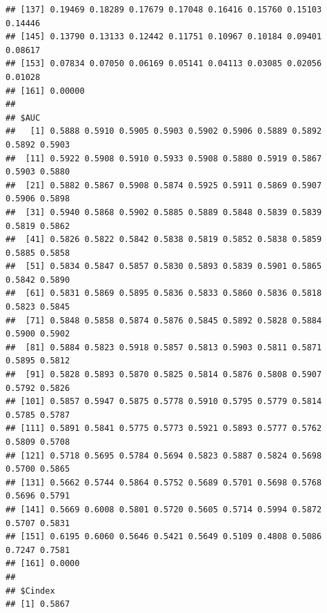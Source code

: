 \documentclass{article}\usepackage[]{graphicx}\usepackage[]{color}
\makeatletter
\newenvironment{kframe}{%
 \def\at@end@of@kframe{}%
 \ifinner\ifhmode%
  \def\at@end@of@kframe{\end{minipage}}%
  \begin{minipage}{\columnwidth}%
 \fi\fi%
 \def\FrameCommand##1{\hskip\@totalleftmargin \hskip-\fboxsep
 \colorbox{shadecolor}{##1}\hskip-\fboxsep
     \hskip-\linewidth \hskip-\@totalleftmargin \hskip\columnwidth}%
 \MakeFramed {\advance\hsize-\width
   \@totalleftmargin\z@ \linewidth\hsize
   \@setminipage}}%
 {\par\unskip\endMakeFramed%
 \at@end@of@kframe}
\newenvironment{knitrout}{}{} %
\makeatother
\begin{document}
\begin{knitrout}
\begin{kframe}
\begin{verbatim}
## [137] 0.19469 0.18289 0.17679 0.17048 0.16416 0.15760 0.15103 0.14446
## [145] 0.13790 0.13133 0.12442 0.11751 0.10967 0.10184 0.09401 0.08617
## [153] 0.07834 0.07050 0.06169 0.05141 0.04113 0.03085 0.02056 0.01028
## [161] 0.00000
## 
## $AUC
##   [1] 0.5888 0.5910 0.5905 0.5903 0.5902 0.5906 0.5889 0.5892 0.5892 0.5903
##  [11] 0.5922 0.5908 0.5910 0.5933 0.5908 0.5880 0.5919 0.5867 0.5903 0.5880
##  [21] 0.5882 0.5867 0.5908 0.5874 0.5925 0.5911 0.5869 0.5907 0.5906 0.5898
##  [31] 0.5940 0.5868 0.5902 0.5885 0.5889 0.5848 0.5839 0.5839 0.5819 0.5862
##  [41] 0.5826 0.5822 0.5842 0.5838 0.5819 0.5852 0.5838 0.5859 0.5885 0.5858
##  [51] 0.5834 0.5847 0.5857 0.5830 0.5893 0.5839 0.5901 0.5865 0.5842 0.5890
##  [61] 0.5831 0.5869 0.5895 0.5836 0.5833 0.5860 0.5836 0.5818 0.5823 0.5845
##  [71] 0.5848 0.5858 0.5874 0.5876 0.5845 0.5892 0.5828 0.5884 0.5900 0.5902
##  [81] 0.5884 0.5823 0.5918 0.5857 0.5813 0.5903 0.5811 0.5871 0.5895 0.5812
##  [91] 0.5828 0.5893 0.5870 0.5825 0.5814 0.5876 0.5808 0.5907 0.5792 0.5826
## [101] 0.5857 0.5947 0.5875 0.5778 0.5910 0.5795 0.5779 0.5814 0.5785 0.5787
## [111] 0.5891 0.5841 0.5775 0.5773 0.5921 0.5893 0.5777 0.5762 0.5809 0.5708
## [121] 0.5718 0.5695 0.5784 0.5694 0.5823 0.5887 0.5824 0.5698 0.5700 0.5865
## [131] 0.5662 0.5744 0.5864 0.5752 0.5689 0.5701 0.5698 0.5768 0.5696 0.5791
## [141] 0.5669 0.6008 0.5801 0.5720 0.5605 0.5714 0.5994 0.5872 0.5707 0.5831
## [151] 0.6195 0.6060 0.5646 0.5421 0.5649 0.5109 0.4808 0.5086 0.7247 0.7581
## [161] 0.0000
## 
## $Cindex
## [1] 0.5867
\end{verbatim}
\end{kframe}
\end{knitrout}
\end{document}
